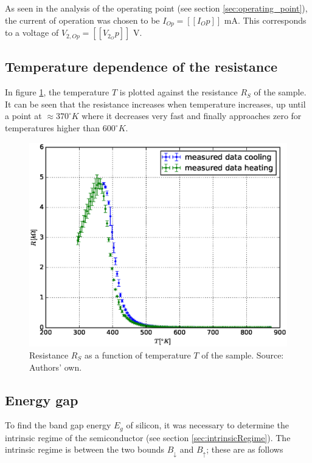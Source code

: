 \documentclass[a4paper]{article}
\begin{document}
As seen in the analysis of the operating point (see section \ref{sec:operating_point}), the current of operation was chosen to be $I_{Op} = [[I_Op]]$ mA. This corresponds to a voltage of $V_{2,Op} = [[V_2_Op]]$ V.

\subsection{Temperature dependence of the resistance}

In figure \ref{fig:temperature_resistance}, the temperature $T$ is plotted against the resistance $R_S$ of the sample. It can be seen that the resistance increases when temperature increases, up until a point at  $\approx 370^{\circ}K$ where it decreases very fast and finally approaches zero for temperatures higher than $600^{\circ}K$.

\begin{figure}[H]
\captionsetup{singlelinecheck=off}
\centering
\includegraphics[width=1.0\textwidth]{plots/temperature_resistance.eps}
\caption[blubb]{Resistance $R_S$ as a function of temperature $T$ of the sample. Source: Authors' own.}
\label{fig:temperature_resistance}
\end{figure}

\subsection{Energy gap}

To find the band gap energy $E_g$ of silicon, it was necessary to determine the intrinsic regime of the semiconductor (see section \ref{sec:intrinsicRegime}). The intrinsic regime is between the two bounds $B_{\downarrow}$ and $B_{\uparrow}$; these are as follows
\end{document}
